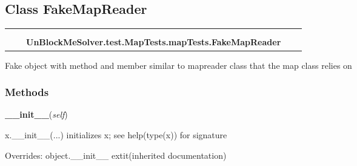 \subsection{Class FakeMapReader}

    \label{UnBlockMeSolver:test:MapTests:mapTests:FakeMapReader}
\begin{tabular}{cccccc}
\multicolumn{2}{r}{\settowidth{\BCL}{object}\multirow{2}{\BCL}{object}}
&&
  \\\cline{3-3}
  &&\multicolumn{1}{c|}{}
&&
  \\
&&\multicolumn{2}{l}{\textbf{UnBlockMeSolver.test.MapTests.mapTests.FakeMapReader}}
\end{tabular}

Fake object with method and member similar to mapreader class that the map 
class relies on



  \subsubsection{Methods}

    \vspace{0.5ex}

\hspace{.8\funcindent}\begin{boxedminipage}{\funcwidth}

    \raggedright \textbf{\_\_init\_\_}(\textit{self})

\setlength{\parskip}{2ex}
    x.\_\_init\_\_(...) initializes x; see help(type(x)) for signature

\setlength{\parskip}{1ex}
      Overrides: object.\_\_init\_\_ 	extit{(inherited documentation)}

    \end{boxedminipage}

    \label{UnBlockMeSolver:test:MapTests:mapTests:FakeMapReader:get}

